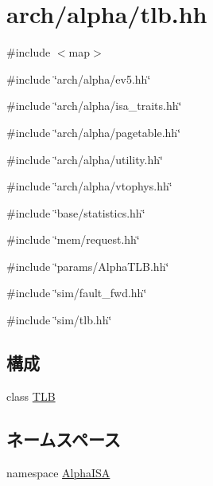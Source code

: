 \hypertarget{arch_2alpha_2tlb_8hh}{
\section{arch/alpha/tlb.hh}
\label{arch_2alpha_2tlb_8hh}
}
{\ttfamily \#include $<$map$>$}\par
{\ttfamily \#include \char`\"{}arch/alpha/ev5.hh\char`\"{}}\par
{\ttfamily \#include \char`\"{}arch/alpha/isa\_\-traits.hh\char`\"{}}\par
{\ttfamily \#include \char`\"{}arch/alpha/pagetable.hh\char`\"{}}\par
{\ttfamily \#include \char`\"{}arch/alpha/utility.hh\char`\"{}}\par
{\ttfamily \#include \char`\"{}arch/alpha/vtophys.hh\char`\"{}}\par
{\ttfamily \#include \char`\"{}base/statistics.hh\char`\"{}}\par
{\ttfamily \#include \char`\"{}mem/request.hh\char`\"{}}\par
{\ttfamily \#include \char`\"{}params/AlphaTLB.hh\char`\"{}}\par
{\ttfamily \#include \char`\"{}sim/fault\_\-fwd.hh\char`\"{}}\par
{\ttfamily \#include \char`\"{}sim/tlb.hh\char`\"{}}\par
\subsection*{構成}
\begin{DoxyCompactItemize}
\item 
class \hyperlink{classAlphaISA_1_1TLB}{TLB}
\end{DoxyCompactItemize}
\subsection*{ネームスペース}
\begin{DoxyCompactItemize}
\item 
namespace \hyperlink{namespaceAlphaISA}{AlphaISA}
\end{DoxyCompactItemize}
